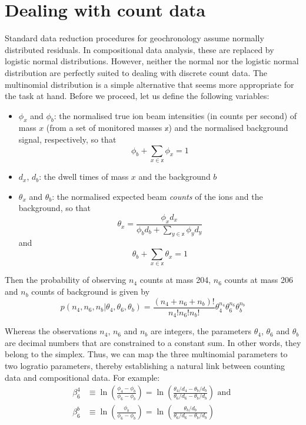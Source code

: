\documentclass{article}
\begin{document}
\section{Dealing with count data}
\label{sec:counts}

Standard data reduction procedures for geochronology assume normally
distributed residuals. In compositional data analysis, these are
replaced by logistic normal distributions. However, neither the normal
nor the logistic normal distribution are perfectly suited to dealing
with discrete count data. The multinomial distribution is a simple
alternative that seems more appropriate for the task at hand. Before
we proceed, let us define the following variables:

\begin{itemize}
\item $\phi_{x}$ and $\phi_{b}$: the normalised true ion beam
  intensities (in counts per second) of mass $x$ (from a set of
  monitored masses $\mathbb{x}$) and the normalised background signal,
  respectively, so that
  \begin{equation}
    \phi_b + \sum_{{x}\in\mathbb{x}}\phi_{x} =1
  \end{equation}
\item $d_x$, $d_b$: the dwell times of mass $x$ and the background $b$
\item $\theta_{x}$ and $\theta_b$: the normalised expected beam
  \emph{counts} of the ions and the background, so that
\begin{equation}
  \theta_{x} = \frac{\phi_{x}d_{x}}
        {\phi_bd_b + \sum_{y\in\mathbb{x}}\phi_{y}d_y}
        \label{eq:thetax}
\end{equation}
\noindent and
\begin{equation}
  \theta_b + \sum_{x\in\mathbb{x}}\theta_{x} =1
\end{equation}
\end{itemize}

Then the probability of observing $n_4$ counts at mass 204, $n_6$
counts at mass 206 and $n_b$ counts of background is given by
\begin{equation}
  p(n_4,n_6,n_b|\theta_4,\theta_6,\theta_b) = 
  \frac{(n_4\!\!+\!n_6\!+\!n_b)!}{n_4!n_6!n_b!}
  \theta_4^{n_4}\theta_6^{n_6}\theta_b^{n_b}
  \label{eq:p46b}
\end{equation}

Whereas the observations $n_4$, $n_6$ and $n_b$ are integers, the
parameters $\theta_4$, $\theta_6$ and $\theta_b$ are decimal numbers
that are constrained to a constant sum. In other words, they belong to
the simplex. Thus, we can map the three multinomial parameters to two
logratio parameters, thereby establishing a natural link between
counting data and compositional data. For example:
\begin{align}
  \beta^{4}_{6} & \equiv
  \ln\!\left(\frac{\phi_4-\phi_b}{\phi_6-\phi_b}\right) = 
  \ln\!\left(\frac{\theta_4/d_4-\theta_b/d_b}{\theta_6/d_6-\theta_b/d_b}\right) \mbox{~and~} \\  
  \beta^{b}_{6} & \equiv
  \ln\!\left(\frac{\phi_b}{\phi_6-\phi_b}\right) = 
  \ln\!\left(\frac{\theta_b/d_b}{\theta_6/d_6-\theta_b/d_b}\right)
\end{align}
\end{document}
